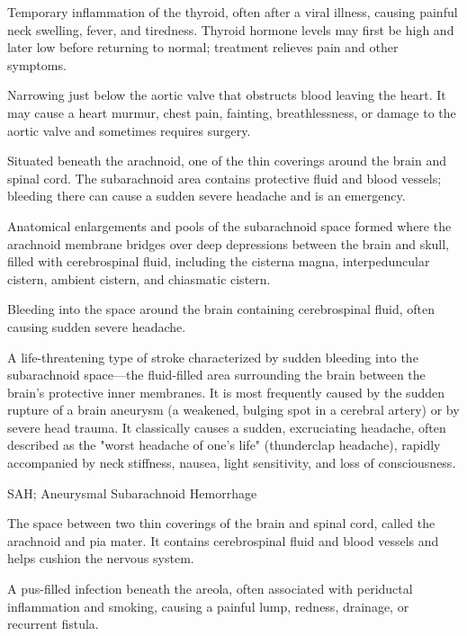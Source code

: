  Temporary inflammation of the thyroid, often after a viral illness, causing painful neck swelling, fever, and tiredness. Thyroid hormone levels may first be high and later low before returning to normal; treatment relieves pain and other symptoms.

 Narrowing just below the aortic valve that obstructs blood leaving the heart. It may cause a heart murmur, chest pain, fainting, breathlessness, or damage to the aortic valve and sometimes requires surgery.

 Situated beneath the arachnoid, one of the thin coverings around the brain and spinal cord. The subarachnoid area contains protective fluid and blood vessels; bleeding there can cause a sudden severe headache and is an emergency.

 Anatomical enlargements and pools of the subarachnoid space formed where the arachnoid membrane bridges over deep depressions between the brain and skull, filled with cerebrospinal fluid, including the cisterna magna, interpeduncular cistern, ambient cistern, and chiasmatic cistern.

 Bleeding into the space around the brain containing cerebrospinal fluid, often causing sudden severe headache.

 A life-threatening type of stroke characterized by sudden bleeding into the subarachnoid space---the fluid-filled area surrounding the brain between the brain's protective inner membranes. It is most frequently caused by the sudden rupture of a brain aneurysm (a weakened, bulging spot in a cerebral artery) or by severe head trauma. It classically causes a sudden, excruciating headache, often described as the "worst headache of one's life" (thunderclap headache), rapidly accompanied by neck stiffness, nausea, light sensitivity, and loss of consciousness.

\synonyms
SAH; Aneurysmal Subarachnoid Hemorrhage

 The space between two thin coverings of the brain and spinal cord, called the arachnoid and pia mater. It contains cerebrospinal fluid and blood vessels and helps cushion the nervous system.

 A pus-filled infection beneath the areola, often associated with periductal inflammation and smoking, causing a painful lump, redness, drainage, or recurrent fistula.

